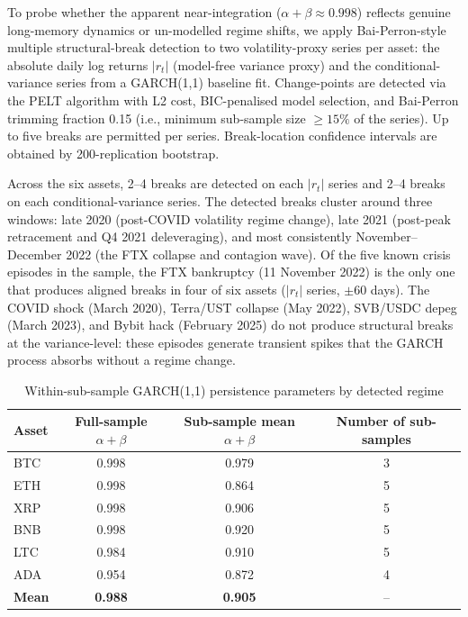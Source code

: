 \documentclass[pdflatex,sn-mathphys-num]{sn-jnl}
\theoremstyle{thmstyleone}
\theoremstyle{thmstyletwo}
\theoremstyle{thmstylethree}
\begin{document}
To probe whether the apparent near-integration ($\alpha + \beta \approx 0.998$) reflects genuine long-memory dynamics or un-modelled regime shifts, we apply Bai-Perron-style multiple structural-break detection \citep{BaiPerron1998, BaiPerron2003} to two volatility-proxy series per asset: the absolute daily log returns $|r_t|$ (model-free variance proxy) and the conditional-variance series from a GARCH(1,1) baseline fit. Change-points are detected via the PELT algorithm \citep{KillickFearnheadEckley2012} with L2 cost, BIC-penalised model selection, and Bai-Perron trimming fraction 0.15 (i.e., minimum sub-sample size $\geq 15\%$ of the series). Up to five breaks are permitted per series. Break-location confidence intervals are obtained by 200-replication bootstrap.

Across the six assets, 2--4 breaks are detected on each $|r_t|$ series and 2--4 breaks on each conditional-variance series. The detected breaks cluster around three windows: late 2020 (post-COVID volatility regime change), late 2021 (post-peak retracement and Q4 2021 deleveraging), and most consistently November--December 2022 (the FTX collapse and contagion wave). Of the five known crisis episodes in the sample, the FTX bankruptcy (11 November 2022) is the only one that produces aligned breaks in four of six assets ($|r_t|$ series, $\pm$60 days). The COVID shock (March 2020), Terra/UST collapse (May 2022), SVB/USDC depeg (March 2023), and Bybit hack (February 2025) do not produce structural breaks at the variance-level: these episodes generate transient spikes that the GARCH process absorbs without a regime change.

\begin{table}[htbp]
\centering
\caption{Within-sub-sample GARCH(1,1) persistence parameters by detected regime}\label{tab:bai_perron_persistence}
\small
\begin{tabular}{@{}lccc@{}}
\toprule
\textbf{Asset} & \textbf{Full-sample $\alpha+\beta$} & \textbf{Sub-sample mean $\alpha+\beta$} & \textbf{Number of sub-samples} \\
\midrule
BTC & 0.998 & 0.979 & 3 \\
ETH & 0.998 & 0.864 & 5 \\
XRP & 0.998 & 0.906 & 5 \\
BNB & 0.998 & 0.920 & 5 \\
LTC & 0.984 & 0.910 & 5 \\
ADA & 0.954 & 0.872 & 4 \\
\midrule
\textbf{Mean} & \textbf{0.988} & \textbf{0.905} & -- \\
\bottomrule
\end{tabular}
\end{table}
\end{document}
